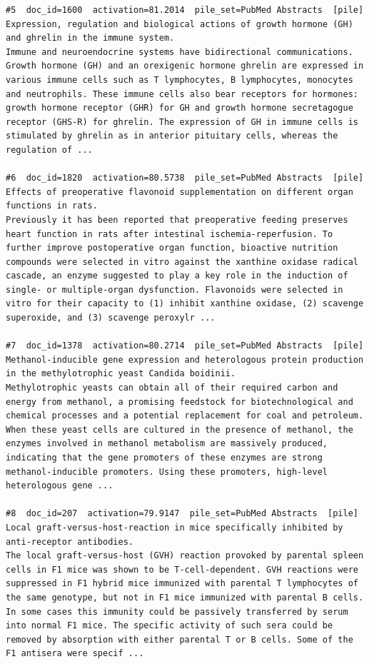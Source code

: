 \begin{verbatim}
#5  doc_id=1600  activation=81.2014  pile_set=PubMed Abstracts  [pile]
Expression, regulation and biological actions of growth hormone (GH) and ghrelin in the immune system.
Immune and neuroendocrine systems have bidirectional communications. Growth hormone (GH) and an orexigenic hormone ghrelin are expressed in various immune cells such as T lymphocytes, B lymphocytes, monocytes and neutrophils. These immune cells also bear receptors for hormones: growth hormone receptor (GHR) for GH and growth hormone secretagogue receptor (GHS-R) for ghrelin. The expression of GH in immune cells is stimulated by ghrelin as in anterior pituitary cells, whereas the regulation of ...

#6  doc_id=1820  activation=80.5738  pile_set=PubMed Abstracts  [pile]
Effects of preoperative flavonoid supplementation on different organ functions in rats.
Previously it has been reported that preoperative feeding preserves heart function in rats after intestinal ischemia-reperfusion. To further improve postoperative organ function, bioactive nutrition compounds were selected in vitro against the xanthine oxidase radical cascade, an enzyme suggested to play a key role in the induction of single- or multiple-organ dysfunction. Flavonoids were selected in vitro for their capacity to (1) inhibit xanthine oxidase, (2) scavenge superoxide, and (3) scavenge peroxylr ...

#7  doc_id=1378  activation=80.2714  pile_set=PubMed Abstracts  [pile]
Methanol-inducible gene expression and heterologous protein production in the methylotrophic yeast Candida boidinii.
Methylotrophic yeasts can obtain all of their required carbon and energy from methanol, a promising feedstock for biotechnological and chemical processes and a potential replacement for coal and petroleum. When these yeast cells are cultured in the presence of methanol, the enzymes involved in methanol metabolism are massively produced, indicating that the gene promoters of these enzymes are strong methanol-inducible promoters. Using these promoters, high-level heterologous gene ...

#8  doc_id=207  activation=79.9147  pile_set=PubMed Abstracts  [pile]
Local graft-versus-host-reaction in mice specifically inhibited by anti-receptor antibodies.
The local graft-versus-host (GVH) reaction provoked by parental spleen cells in F1 mice was shown to be T-cell-dependent. GVH reactions were suppressed in F1 hybrid mice immunized with parental T lymphocytes of the same genotype, but not in F1 mice immunized with parental B cells. In some cases this immunity could be passively transferred by serum into normal F1 mice. The specific activity of such sera could be removed by absorption with either parental T or B cells. Some of the F1 antisera were specif ...


\end{verbatim}
